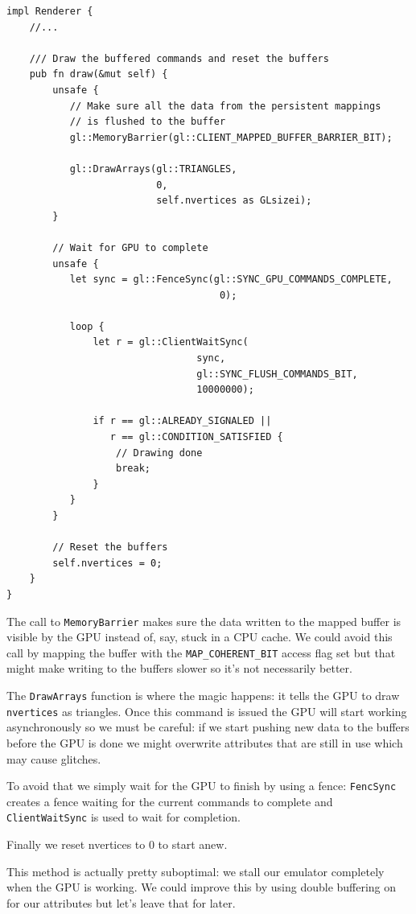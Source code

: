 \documentclass[a4paper]{article}
\newcommand{\code}[1] {\texttt{#1}}
\begin{document}
\begin{lstlisting}
impl Renderer {
    //...

    /// Draw the buffered commands and reset the buffers
    pub fn draw(&mut self) {
        unsafe {
           // Make sure all the data from the persistent mappings
           // is flushed to the buffer
           gl::MemoryBarrier(gl::CLIENT_MAPPED_BUFFER_BARRIER_BIT);

           gl::DrawArrays(gl::TRIANGLES,
                          0,
                          self.nvertices as GLsizei);
        }

        // Wait for GPU to complete
        unsafe {
           let sync = gl::FenceSync(gl::SYNC_GPU_COMMANDS_COMPLETE,
                                     0);

           loop {
               let r = gl::ClientWaitSync(
                                 sync,
                                 gl::SYNC_FLUSH_COMMANDS_BIT,
                                 10000000);

               if r == gl::ALREADY_SIGNALED ||
                  r == gl::CONDITION_SATISFIED {
                   // Drawing done
                   break;
               }
           }
        }

        // Reset the buffers
        self.nvertices = 0;
    }
}
\end{lstlisting}

The call to \code{MemoryBarrier} makes sure the data written to the
mapped buffer is visible by the GPU instead of, say, stuck in a CPU
cache. We could avoid this call by mapping the buffer with the
\code{MAP\_COHERENT\_BIT} access flag set but that might make writing
to the buffers slower so it's not necessarily better.

The \code{DrawArrays} function is where the magic happens: it tells
the GPU to draw \code{nvertices} as triangles. Once this command is
issued the GPU will start working asynchronously so we must be
careful: if we start pushing new data to the buffers before the GPU is
done we might overwrite attributes that are still in use which may
cause glitches.

To avoid that we simply wait for the GPU to finish by using a fence:
\code{FencSync} creates a fence waiting for the current commands to
complete and \code{ClientWaitSync} is used to wait for completion.

Finally we reset nvertices to 0 to start anew.

This method is actually pretty suboptimal: we stall our emulator
completely when the GPU is working. We could improve this by using
double buffering on for our attributes but let's leave that for later.
\end{document}
